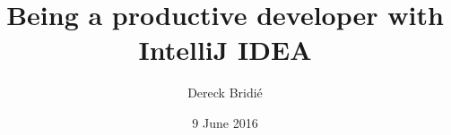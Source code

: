 \documentclass{beamer}
\title{Being a productive developer with IntelliJ IDEA}
\author{Dereck Bridi\'e}
\date{9 June 2016}
\begin{document}
\begin{frame}
\maketitle
\end{frame}
\end{document}

